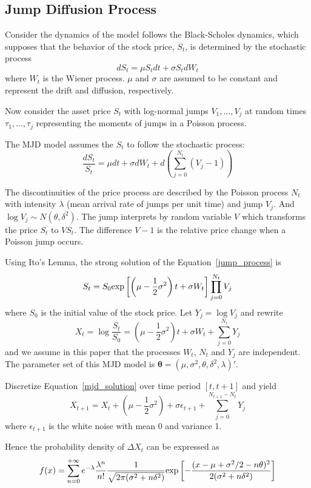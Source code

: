 \documentclass[11pt,reqno,final]{amsart}
\def\exp{\hbox{\rm exp}}
\begin{document}
\subsection{Jump Diffusion Process}
Consider the dynamics of the model follows the Black-Scholes dynamics, which supposes
that the behavior of the stock price, $S_t$, is determined by the stochastic process
$$
dS_t = \mu S_t dt + \sigma S_t dW_t
$$
where $W_t$ is the Wiener process. $\mu$ and $\sigma$ are assumed to be constant and
represent the drift and diffusion, respectively.

Now consider the asset price $S_t$ with log-normal jumps $V_1, \ldots, V_j$ at random times
$\tau_1, \ldots, \tau_j$ representing the moments of jumps in a Poisson process.

The MJD model assumes the $S_t$ to follow the stochastic process:
\begin{equation} \label{jump_process}
\frac{dS_t}{S_t} = \mu dt + \sigma dW_t + d\left( \sum_{j=0}^{N_t}(V_j -1) \right)
\end{equation}

The discontinuities of the price process are described by the Poisson process $N_t$
with intensity $\lambda$ (mean arrival rate of jumps per unit time) and jump $V_j$.
And $\log V_j \sim N(\theta, \delta^2)$. The jump interprets by random variable $V$ which
transforms the price $S_t$ to $VS_t$. The difference $V-1$ is the relative price change when
a Poisson jump occurs.

Using Ito's Lemma, the strong solution of the Equation~\ref{jump_process} is
$$
S_t = S_0 \exp\left[\left( \mu - \frac{1}{2} \sigma^2 \right)t + \sigma W_t \right] \prod_{j=0}^{N_t} V_j
$$
where $S_0$ is the initial value of the stock price. Let $Y_j = \log V_j$ and rewrite
\begin{equation} \label{mjd_solution}
X_t = \log\frac{S_t}{S_0} = \left(\mu-\frac{1}{2} \sigma^2 \right)t + \sigma W_t + \sum_{j=0}^{N_t}Y_j
\end{equation}
and we assume in this paper that the processes $W_t$, $N_t$ and $Y_j$ are independent. The parameter set
of this MJD model is $\mathbf{\theta}=(\mu, \sigma^2, \theta, \delta^2, \lambda)'$.

Discretize Equation~\ref{mjd_solution} over time period $[t, t+1]$ and yield
$$
X_{t+1} = X_t + \left( \mu - \frac{1}{2}\sigma^2 \right) + \sigma \epsilon_{t+1} + \sum_{j=0}^{N_{t+1}-N_{t}}Y_j
$$
where $\epsilon_{t+1}$ is the white noise with mean 0 and variance 1.

Hence the probability density of $\Delta X_t$ can be expressed as
$$
f(x) = \sum_{n=0}^{+\infty} e^{-\lambda}\frac{\lambda^n}{n!} \frac{1}{\sqrt{2\pi(\sigma^2+n\delta^2)}} \exp\left[ -\frac{(x-\mu+\sigma^2/2 -n\theta)^2}{2(\sigma^2+n\delta^2)} \right]
$$
\end{document}
